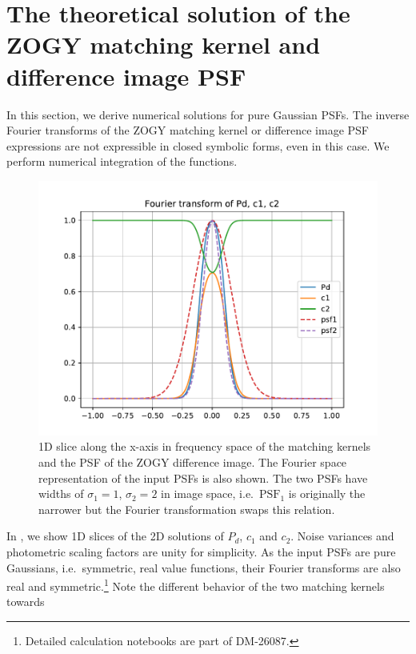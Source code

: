 \section{The theoretical solution of the ZOGY matching kernel and difference
image PSF\label{sec:ZOGYtheo}}
%
\par In this section, we derive numerical solutions for pure Gaussian
PSFs. The inverse Fourier transforms of the ZOGY matching
kernel or difference image PSF expressions are not expressible in closed
symbolic forms, even in this case. We perform numerical integration of the
functions.
%
\begin{figure}
\begin{center}
  \includegraphics[width=5.5in]{fig/zogy_theo_Gaussians_ft_Pd_c1_c2.pdf}
\end{center}
\caption{\label{fig:theo_Gaussians_ft}1D slice along the x-axis in frequency
  space of the matching kernels and the PSF of the ZOGY difference
  image. The Fourier space representation of the input PSFs is also
  shown. The two PSFs have widths of $\sigma_1 = 1$, $\sigma_2 = 2$ in image
  space, i.e.\ \(\mathrm{PSF}_1\) is originally the narrower but the Fourier
  transformation swaps this relation.}
\end{figure}
%
\par In , we show 1D slices of the 2D solutions
of \(P_d\), \(c_1\) and \(c_2\). Noise variances and photometric scaling
factors are unity for simplicity. As the input PSFs are pure Gaussians,
i.e.\ symmetric, real value functions, their Fourier transforms are also
real and symmetric.\footnote{Detailed calculation notebooks are part of
  DM-26087.} Note the different behavior of the two matching kernels towards
